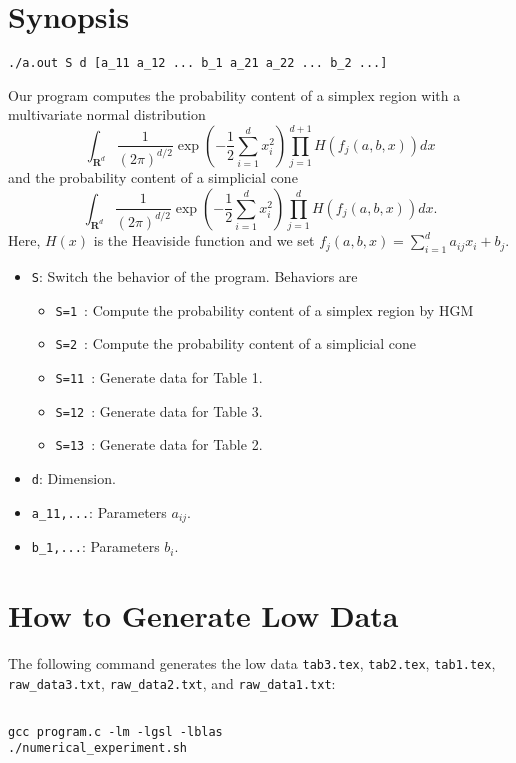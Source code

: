 \documentclass[12pt]{article}
\begin{document}
\section{Synopsis}
\begin{verbatim}
./a.out S d [a_11 a_12 ... b_1 a_21 a_22 ... b_2 ...]
\end{verbatim}
Our program computes 
the probability content of a simplex region
with a multivariate normal distribution
$$
\int_{\mathbf R^d} \frac{1}{(2\pi)^{d/2}}
\exp\left(-\frac{1}{2}\sum_{i=1}^dx_i^2\right)
\prod_{j=1}^{d+1}H\left(f_j(a,b,x)\right)
dx
$$
and the probability content of a simplicial cone
$$
\int_{\mathbf R^d} \frac{1}{(2\pi)^{d/2}}
\exp\left(-\frac{1}{2}\sum_{i=1}^dx_i^2\right)
\prod_{j=1}^dH\left(f_j(a,b,x)\right)
dx.
$$
Here, $H(x)$ is the Heaviside function and we set 
$f_j(a,b,x)=\sum_{i=1}^da_{ij}x_i+b_j$.
\begin{itemize}
\item \verb+S+\/: Switch the behavior of the program. Behaviors are
  \begin{itemize}
    \item \verb+S=1+\ : %
    Compute the probability content of a simplex region by HGM
    \item \verb+S=2+\ : %
    Compute the probability content of a simplicial cone
    \item \verb+S=11+\ : %
    Generate data for Table 1.
    \item \verb+S=12+\ : %
    Generate data for Table 3.
    \item \verb+S=13+\ : %
    Generate data for Table 2.
  \end{itemize}
\item \verb+d+\/: Dimension.
\item \verb+a_11,...+\/: Parameters $a_{ij}$.
\item \verb+b_1,...+\/: Parameters $b_i$.
\end{itemize}


\section{How to Generate Low Data}
The following command generates the low data
{\tt tab3.tex}, 
{\tt tab2.tex}, 
{\tt tab1.tex}, 
{\tt raw\_data3.txt}, 
{\tt raw\_data2.txt}, and
{\tt raw\_data1.txt}:
\begin{lstlisting}[style=BashInputStyle]

gcc program.c -lm -lgsl -lblas
./numerical_experiment.sh
\end{lstlisting}
\end{document}
